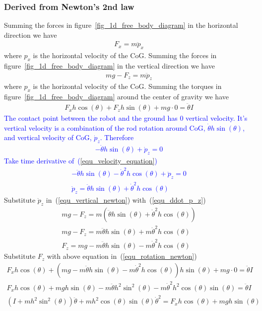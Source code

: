 \documentclass[12pt]{article}
\begin{document}
\subsubsection{Derived from Newton's 2nd law}
Summing the forces in figure~\ref{fig_1d_free_body_diagram} in the horizontal
direction we have
\begin{align}
F_x=m\ddot{p}_x
\end{align}
where $p_x$ is the horizontal velocity of the CoG.
Summing the forces in figure~\ref{fig_1d_free_body_diagram} in the vertical
direction we have
\begin{align}
mg-F_z = m\ddot{p}_z
\label{equ_vertical_newton}
\end{align}
where $p_x$ is the horizontal velocity of the CoG.
Summing the torques in figure~\ref{fig_1d_free_body_diagram} around the
center of gravity we have
\begin{align}
F_x h\cos(\theta) + F_z h\sin(\theta) + mg\cdot 0= \ddot{\theta}I
\label{equ_rotation_newton}
\end{align}
\textcolor{blue}{
The contact point between the robot and the ground has $0$ vertical velocity.
It's vertical velocity is a combination of the rod rotation around 
CoG, $\dot{\theta}h\sin(\theta)$,
and vertical velocity of CoG, $\dot{p}_z$. Therefore
\begin{align}
-\dot{\theta}h\sin(\theta) + \dot{p}_z = 0
\label{equ_velocity_equation}
\end{align}
Take time derivative of~(\ref{equ_velocity_equation})
\begin{align}
-\ddot{\theta}h\sin(\theta) - \dot{\theta}^2h\cos(\theta) + \ddot{p}_z = 0\\
\ddot{p}_z = \ddot{\theta}h\sin(\theta) + \dot{\theta}^2h\cos(\theta)
\label{equ_ddot_p_z}
\end{align}}
Substitute $\ddot{p}_z$ in~(\ref{equ_vertical_newton}) 
with~(\ref{equ_ddot_p_z})
\begin{align}
mg-F_z = m(\ddot{\theta}h\sin(\theta) + \dot{\theta}^2h\cos(\theta)) \\
mg-F_z = m\ddot{\theta}h\sin(\theta) + m\dot{\theta}^2h\cos(\theta) \\
F_z = mg - m\ddot{\theta}h\sin(\theta) - m\dot{\theta}^2h\cos(\theta)
\end{align}
Substitute $F_z$ with above equation in~(\ref{equ_rotation_newton})
\begin{align}
F_xh\cos(\theta) + (mg - m\ddot{\theta}h\sin(\theta) 
- m\dot{\theta}^2h\cos(\theta))h\sin(\theta) + mg\cdot 0= \ddot{\theta}I\\
F_xh\cos(\theta) + mgh\sin(\theta) - m\ddot{\theta}h^2\sin^2(\theta) 
- m\dot{\theta}^2h^2\cos(\theta)\sin(\theta) = \ddot{\theta}I \\
(I+mh^2\sin^2(\theta))\ddot{\theta}+mh^2\cos(\theta)\sin(\theta)\dot{\theta}^2
=F_xh\cos(\theta) + mgh\sin(\theta)
\end{align}
\end{document}
